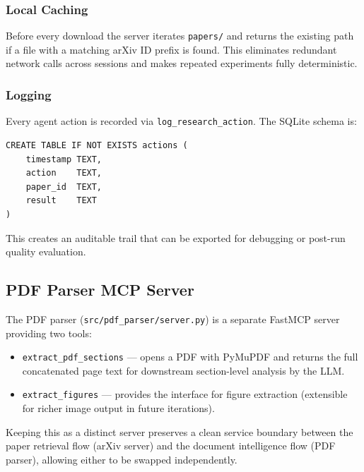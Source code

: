 \documentclass[12pt, a4paper]{article}
\newcommand{\code}[1]{\texttt{\small\color{darwinblue}#1}}
\begin{document}
\subsubsection{Local Caching}

Before every download the server iterates \code{papers/} and returns the existing path if a file with a matching arXiv ID prefix is found. This eliminates redundant network calls across sessions and makes repeated experiments fully deterministic.

\subsubsection{Logging}

Every agent action is recorded via \code{log\_research\_action}. The SQLite schema is:

\begin{lstlisting}[style=pycode]
CREATE TABLE IF NOT EXISTS actions (
    timestamp TEXT,
    action    TEXT,
    paper_id  TEXT,
    result    TEXT
)
\end{lstlisting}

This creates an auditable trail that can be exported for debugging or post-run quality evaluation.

\subsection{PDF Parser MCP Server}

The PDF parser (\code{src/pdf\_parser/server.py}) is a separate FastMCP server providing two tools:

\begin{itemize}[leftmargin=2em, itemsep=4pt]
    \item \code{extract\_pdf\_sections} --- opens a PDF with PyMuPDF and returns the full concatenated page text for downstream section-level analysis by the LLM.
    \item \code{extract\_figures} --- provides the interface for figure extraction (extensible for richer image output in future iterations).
\end{itemize}

Keeping this as a distinct server preserves a clean service boundary between the paper retrieval flow (arXiv server) and the document intelligence flow (PDF parser), allowing either to be swapped independently.

\end{document}
